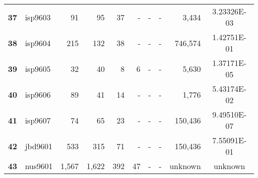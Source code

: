 \begin{longtable}{@{}llrrrrrrrc@{}}
\textbf{37} & isp9603  & 91                   & 95       & 37      & -    & -    & -     & 3,434                & 3.23326E-03 \\
\textbf{38} & isp9604  & 215                  & 132      & 38      & -    & -    & -     & 746,574              & 1.42751E-01 \\
\textbf{39} & isp9605  & 32                   & 40       & 8       & 6    & -    & -     & 5,630                & 1.37171E-05 \\
\textbf{40} & isp9606  & 89                   & 41       & 14      & -    & -    & -     & 1,776                & 5.43174E-02 \\
\textbf{41} & isp9607  & 74                   & 65       & 23      & -    & -    & -     & 150,436              & 9.49510E-07 \\
\textbf{42} & jbd9601  & 533                  & 315      & 71      & -    & -    & -     & 150,436              & 7.55091E-01 \\
\rowcolor[HTML]{F2F2F2} 
\textbf{43} & nus9601  & 1,567                & 1,622    & 392     & 47   & -    & -     & unknown              & unknown     \\* \bottomrule
\end{longtable}